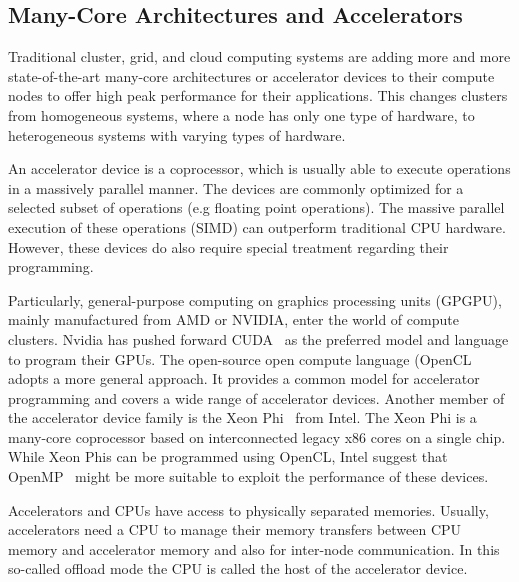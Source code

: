\subsection{Many-Core Architectures and Accelerators}
\label{sec:accel}

Traditional cluster, grid, and cloud computing systems are adding more
and more state-of-the-art many-core architectures or accelerator
devices to their compute nodes to offer high peak performance for
their applications. This changes clusters from homogeneous systems,
where a node has only one type of hardware, to heterogeneous systems
with varying types of hardware.

An accelerator device is a coprocessor, which is usually
able to execute operations in a massively parallel manner.  The
devices are commonly optimized for a selected subset of operations
(e.g floating point operations). The massive parallel execution of
these operations (SIMD) can outperform traditional CPU hardware.
However, these devices do also require special treatment regarding
their programming.

Particularly, general-purpose computing on graphics processing units
(GPGPU), mainly manufactured from AMD or NVIDIA, enter the world of
compute clusters. Nvidia has pushed forward CUDA~\cite{ref:cuda} as
the preferred model and language to program their GPUs. The
open-source open compute language (OpenCL~\cite{ref:opencl} adopts a
more general approach.  It provides a common model for accelerator
programming and covers a wide range of accelerator devices.  Another
member of the accelerator device family is the Xeon
Phi~\cite{ref:xeon_phi} from Intel. The Xeon Phi is a many-core
coprocessor based on interconnected legacy x86 cores on a single
chip. While Xeon Phis can be programmed using OpenCL, Intel suggest
that OpenMP~\cite{ref:openmp} might be more suitable to exploit the
performance of these devices.

Accelerators and CPUs have access to physically separated memories.
Usually, accelerators need a CPU to manage their memory
transfers between CPU memory and accelerator memory and also for inter-node
communication. In this so-called offload mode the
CPU is called the host of the accelerator device.

